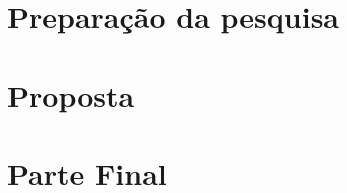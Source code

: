 \documentclass[
	12pt,					%
	openright,				%
	twoside,					%
	a4paper,					%
	english,					%
	brazil					%
	]{abntex2}
\numberwithin{equation}{subsection}
\begin{document}
\part{Preparação da pesquisa}




\part{Proposta}


\part{Parte Final}



\postextual








\end{document}
